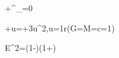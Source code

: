 +\Gamma^\mu_{\alpha\beta}=0

+u=+3u^2,\qquad u=\frac1r\quad(G=M=c=1)

\mathcal E^2=\left(1-\right)\left(1+\right)
